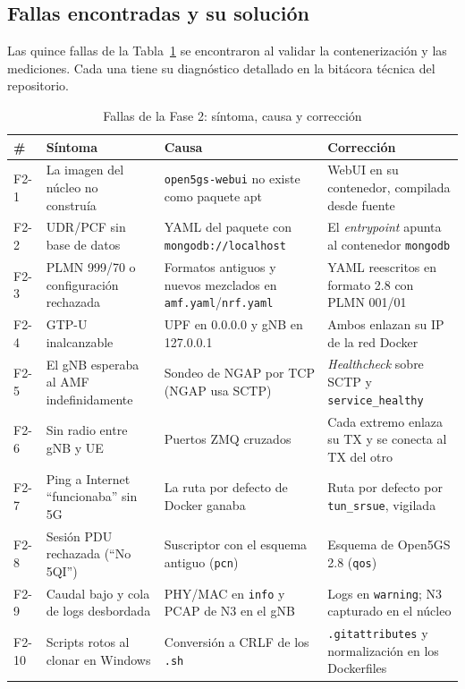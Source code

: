 \documentclass[conference]{IEEEtran}
\begin{document}
\subsection{Fallas encontradas y su solución}
Las quince fallas de la Tabla~\ref{tab:fallas} se encontraron al validar la contenerización y las mediciones. Cada una tiene su diagnóstico detallado en la bitácora técnica del repositorio.

\begin{table}[!t]
\caption{Fallas de la Fase 2: síntoma, causa y corrección}
\label{tab:fallas}
\centering
\footnotesize
\renewcommand{\arraystretch}{1.12}
\begin{tabular}{p{0.7cm}>{\raggedright\arraybackslash}p{5.0cm}>{\raggedright\arraybackslash}p{5.4cm}>{\raggedright\arraybackslash}p{5.4cm}}
\toprule
\textbf{\#} & \textbf{Síntoma} & \textbf{Causa} & \textbf{Corrección} \\
\midrule
F2-1 & La imagen del núcleo no construía & \texttt{open5gs-webui} no existe como paquete apt & WebUI en su contenedor, compilada desde fuente \\
F2-2 & UDR/PCF sin base de datos & YAML del paquete con \texttt{mongodb://localhost} & El \textit{entrypoint} apunta al contenedor \texttt{mongodb} \\
F2-3 & PLMN 999/70 o configuración rechazada & Formatos antiguos y nuevos mezclados en \texttt{amf.yaml}/\texttt{nrf.yaml} & YAML reescritos en formato 2.8 con PLMN 001/01 \\
F2-4 & GTP-U inalcanzable & UPF en 0.0.0.0 y gNB en 127.0.0.1 & Ambos enlazan su IP de la red Docker \\
F2-5 & El gNB esperaba al AMF indefinidamente & Sondeo de NGAP por TCP (NGAP usa SCTP) & \textit{Healthcheck} sobre SCTP y \texttt{service\_healthy} \\
F2-6 & Sin radio entre gNB y UE & Puertos ZMQ cruzados & Cada extremo enlaza su TX y se conecta al TX del otro \\
F2-7 & Ping a Internet ``funcionaba'' sin 5G & La ruta por defecto de Docker ganaba & Ruta por defecto por \texttt{tun\_srsue}, vigilada \\
F2-8 & Sesión PDU rechazada (``No 5QI'') & Suscriptor con el esquema antiguo (\texttt{pcn}) & Esquema de Open5GS 2.8 (\texttt{qos}) \\
F2-9 & Caudal bajo y cola de logs desbordada & PHY/MAC en \texttt{info} y PCAP de N3 en el gNB & Logs en \texttt{warning}; N3 capturado en el núcleo \\
F2-10 & Scripts rotos al clonar en Windows & Conversión a CRLF de los \texttt{.sh} & \texttt{.gitattributes} y normalización en los Dockerfiles \\

\end{tabular}
\end{table}
\end{document}
